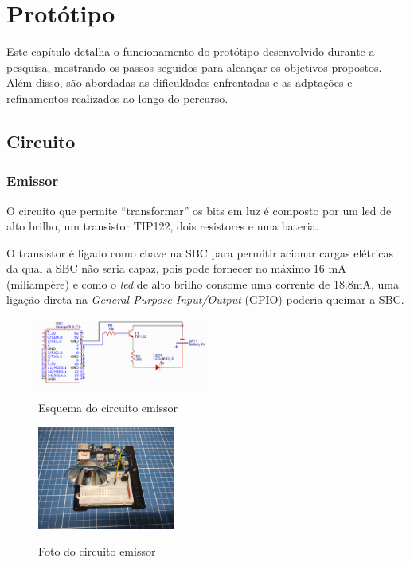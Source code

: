 \section{Protótipo}

Este capítulo detalha o funcionamento do protótipo desenvolvido durante a pesquisa, mostrando os passos seguidos para alcançar os objetivos propostos. Além disso, são abordadas as dificuldades enfrentadas e as adptações e refinamentos realizados ao longo do percurso.

\subsection{Circuito}

\subsubsection{Emissor}

O circuito que permite ``transformar”  os bits em luz é composto por um led de alto brilho, um transistor TIP122, dois resistores e uma bateria.

O transistor é ligado como chave na SBC para permitir acionar cargas elétricas da qual a SBC não seria capaz, pois pode fornecer no máximo 16 mA (miliampère)  e como o \textit{led} de alto brilho consome uma corrente de 18.8mA, uma ligação direta na \textit{General Purpose Input/Output} (GPIO) poderia queimar a SBC.

\begin{figure}[!htbp]
  \caption{Esquema do circuito emissor}
  \includegraphics[width=0.5\textwidth]{images/esquema_circuito_emisor.png}
  \label{esquema-circuito-emissor}
\end{figure}

\begin{figure}[!htbp]
  \caption{Foto do circuito emissor}
  \includegraphics[width=0.4\textwidth]{images/foto_circuito_emisor.jpg}
  \label{foto-circuito-emissor}
\end{figure}

